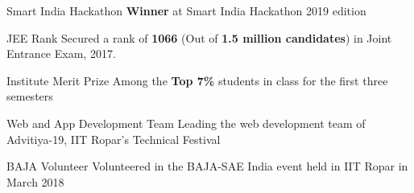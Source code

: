 
\begin{misc}


\cvskill
    {Smart India Hackathon} %
    {{ \textbf{Winner} at Smart India Hackathon 2019 edition}}

    \cvskill
    {JEE Rank} %
    {{Secured a rank of }\textbf{1066} { (Out of \textbf{1.5 million candidates}) }{in Joint Entrance Exam, 2017.}}
 
\cvskill
    {Institute Merit Prize} %
    {{Among the \textbf{Top 7\%} students in class for the first three semesters}}
 

    \cvskill
    {Web and App Development Team} %
    {{Leading the web development team of Advitiya-19, IIT Ropar's Technical Festival}}

\cvskill
    {BAJA Volunteer} %
    {{Volunteered in the BAJA-SAE India event held in IIT Ropar in March 2018}}



\end{misc}

